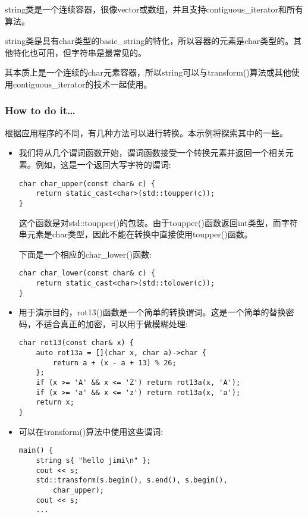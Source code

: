 
string类是一个连续容器，很像vector或数组，并且支持contiguous\_iterator和所有算法。

string类是具有char类型的basic\_string的特化，所以容器的元素是char类型的。其他特化也可用，但字符串是最常见的。

其本质上是一个连续的char元素容器，所以string可以与transform()算法或其他使用contiguous\_iterator的技术一起使用。

\subsubsection{How to do it…}

根据应用程序的不同，有几种方法可以进行转换。本示例将探索其中的一些。

\begin{itemize}
\item 
我们将从几个谓词函数开始，谓词函数接受一个转换元素并返回一个相关元素。例如，这是一个返回大写字符的谓词:

\begin{lstlisting}[style=styleCXX]
char char_upper(const char& c) {
	return static_cast<char>(std::toupper(c));
}
\end{lstlisting}

这个函数是对std::toupper()的包装。由于toupper()函数返回int类型，而字符串元素是char类型，因此不能在转换中直接使用toupper()函数。

下面是一个相应的char\_lower()函数:

\begin{lstlisting}[style=styleCXX]
char char_lower(const char& c) {
	return static_cast<char>(std::tolower(c));
}
\end{lstlisting}

\item 
用于演示目的，rot13()函数是一个简单的转换谓词。这是一个简单的替换密码，不适合真正的加密，可以用于做模糊处理:

\begin{lstlisting}[style=styleCXX]
char rot13(const char& x) {
	auto rot13a = [](char x, char a)->char {
		return a + (x - a + 13) % 26;
	};
	if (x >= 'A' && x <= 'Z') return rot13a(x, 'A');
	if (x >= 'a' && x <= 'z') return rot13a(x, 'a');
	return x;
}
\end{lstlisting}

\item 
可以在transform()算法中使用这些谓词:

\begin{lstlisting}[style=styleCXX]
main() {
	string s{ "hello jimi\n" };
	cout << s;
	std::transform(s.begin(), s.end(), s.begin(),
		char_upper);
	cout << s;
	...
\end{lstlisting}


\end{itemize}
